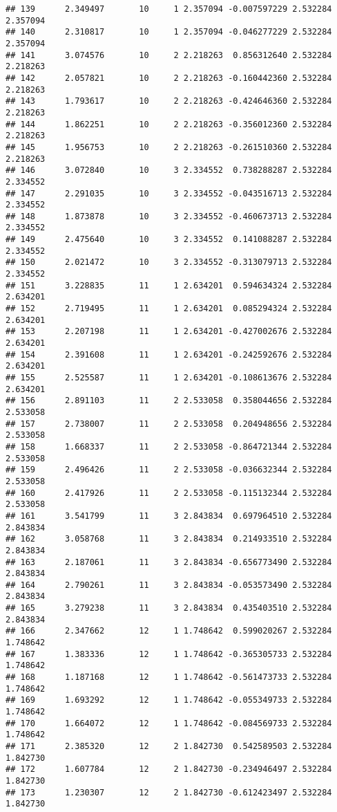 \documentclass[]{book}
\theoremstyle{definition}
\theoremstyle{definition}
\theoremstyle{definition}
\theoremstyle{remark}
\begin{document}
\begin{verbatim}
## 139      2.349497       10     1 2.357094 -0.007597229 2.532284 2.357094
## 140      2.310817       10     1 2.357094 -0.046277229 2.532284 2.357094
## 141      3.074576       10     2 2.218263  0.856312640 2.532284 2.218263
## 142      2.057821       10     2 2.218263 -0.160442360 2.532284 2.218263
## 143      1.793617       10     2 2.218263 -0.424646360 2.532284 2.218263
## 144      1.862251       10     2 2.218263 -0.356012360 2.532284 2.218263
## 145      1.956753       10     2 2.218263 -0.261510360 2.532284 2.218263
## 146      3.072840       10     3 2.334552  0.738288287 2.532284 2.334552
## 147      2.291035       10     3 2.334552 -0.043516713 2.532284 2.334552
## 148      1.873878       10     3 2.334552 -0.460673713 2.532284 2.334552
## 149      2.475640       10     3 2.334552  0.141088287 2.532284 2.334552
## 150      2.021472       10     3 2.334552 -0.313079713 2.532284 2.334552
## 151      3.228835       11     1 2.634201  0.594634324 2.532284 2.634201
## 152      2.719495       11     1 2.634201  0.085294324 2.532284 2.634201
## 153      2.207198       11     1 2.634201 -0.427002676 2.532284 2.634201
## 154      2.391608       11     1 2.634201 -0.242592676 2.532284 2.634201
## 155      2.525587       11     1 2.634201 -0.108613676 2.532284 2.634201
## 156      2.891103       11     2 2.533058  0.358044656 2.532284 2.533058
## 157      2.738007       11     2 2.533058  0.204948656 2.532284 2.533058
## 158      1.668337       11     2 2.533058 -0.864721344 2.532284 2.533058
## 159      2.496426       11     2 2.533058 -0.036632344 2.532284 2.533058
## 160      2.417926       11     2 2.533058 -0.115132344 2.532284 2.533058
## 161      3.541799       11     3 2.843834  0.697964510 2.532284 2.843834
## 162      3.058768       11     3 2.843834  0.214933510 2.532284 2.843834
## 163      2.187061       11     3 2.843834 -0.656773490 2.532284 2.843834
## 164      2.790261       11     3 2.843834 -0.053573490 2.532284 2.843834
## 165      3.279238       11     3 2.843834  0.435403510 2.532284 2.843834
## 166      2.347662       12     1 1.748642  0.599020267 2.532284 1.748642
## 167      1.383336       12     1 1.748642 -0.365305733 2.532284 1.748642
## 168      1.187168       12     1 1.748642 -0.561473733 2.532284 1.748642
## 169      1.693292       12     1 1.748642 -0.055349733 2.532284 1.748642
## 170      1.664072       12     1 1.748642 -0.084569733 2.532284 1.748642
## 171      2.385320       12     2 1.842730  0.542589503 2.532284 1.842730
## 172      1.607784       12     2 1.842730 -0.234946497 2.532284 1.842730
## 173      1.230307       12     2 1.842730 -0.612423497 2.532284 1.842730

\end{verbatim}
\end{document}
